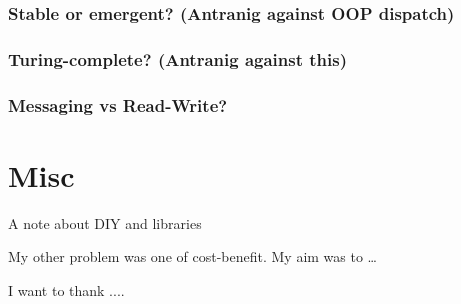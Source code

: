 \documentclass[english,submission]{programming}
\begin{document}
  \hypertarget{stable-or-emergent-antranig-against-oop-dispatch}{%
  \subsubsection{Stable or emergent? (Antranig against OOP
  dispatch)}\label{stable-or-emergent-antranig-against-oop-dispatch}}

  \hypertarget{turing-complete-antranig-against-this}{%
  \subsubsection{Turing-complete? (Antranig against
  this)}\label{turing-complete-antranig-against-this}}

  \hypertarget{messaging-vs-read-write}{%
  \subsubsection{Messaging vs Read-Write?}\label{messaging-vs-read-write}}

  \hypertarget{misc}{%
  \section{Misc}\label{misc}}

  A note about DIY and libraries

  My other problem was one of cost-benefit. My aim was to \ldots{}



\acks
I want to thank ....

\printbibliography
\end{document}
